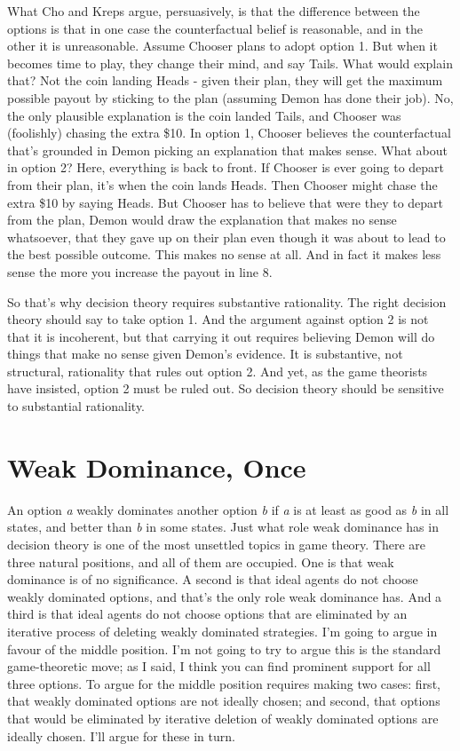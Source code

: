 \documentclass[
  12pt,
  letterpaper,
  DIV=11,
  numbers=noendperiod]{scrreprt}
\begin{document}
What Cho and Kreps argue, persuasively, is that the difference between
the options is that in one case the counterfactual belief is reasonable,
and in the other it is unreasonable. Assume Chooser plans to adopt
option 1. But when it becomes time to play, they change their mind, and
say Tails. What would explain that? Not the coin landing Heads - given
their plan, they will get the maximum possible payout by sticking to the
plan (assuming Demon has done their job). No, the only plausible
explanation is the coin landed Tails, and Chooser was (foolishly)
chasing the extra \$10. In option 1, Chooser believes the counterfactual
that's grounded in Demon picking an explanation that makes sense. What
about in option 2? Here, everything is back to front. If Chooser is ever
going to depart from their plan, it's when the coin lands Heads. Then
Chooser might chase the extra \$10 by saying Heads. But Chooser has to
believe that were they to depart from the plan, Demon would draw the
explanation that makes no sense whatsoever, that they gave up on their
plan even though it was about to lead to the best possible outcome. This
makes no sense at all. And in fact it makes less sense the more you
increase the payout in line 8.

So that's why decision theory requires substantive rationality. The
right decision theory should say to take option 1. And the argument
against option 2 is not that it is incoherent, but that carrying it out
requires believing Demon will do things that make no sense given Demon's
evidence. It is substantive, not structural, rationality that rules out
option 2. And yet, as the game theorists have insisted, option 2 must be
ruled out. So decision theory should be sensitive to substantial
rationality.


\hypertarget{sec-weak}{%
\chapter{Weak Dominance, Once}\label{sec-weak}}

An option \emph{a} weakly dominates another option \emph{b} if \emph{a}
is at least as good as \emph{b} in all states, and better than \emph{b}
in some states. Just what role weak dominance has in decision theory is
one of the most unsettled topics in game theory. There are three natural
positions, and all of them are occupied. One is that weak dominance is
of no significance. A second is that ideal agents do not choose weakly
dominated options, and that's the only role weak dominance has. And a
third is that ideal agents do not choose options that are eliminated by
an iterative process of deleting weakly dominated strategies. I'm going
to argue in favour of the middle position. I'm not going to try to argue
this is the standard game-theoretic move; as I said, I think you can
find prominent support for all three options. To argue for the middle
position requires making two cases: first, that weakly dominated options
are not ideally chosen; and second, that options that would be
eliminated by iterative deletion of weakly dominated options are ideally
chosen. I'll argue for these in turn.
\end{document}
